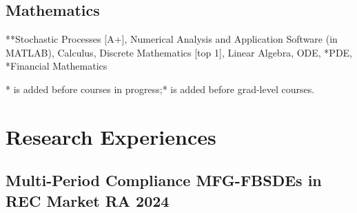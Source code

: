 \documentclass[a4paper]{article}
\newcommand{\mygray}{\color{lg}}
\begin{document}
\subsection{Mathematics} 
**Stochastic Processes [A+], Numerical Analysis and Application Software (in MATLAB), Calculus, Discrete Mathematics [top 1], Linear Algebra, ODE, *PDE, *Financial Mathematics

{\mygray
* is added before courses in progress;\hfill ** is added before grad-level courses.}

\section{Research Experiences}  %

\hypertarget{FBSDEs}{
    \subsection{Multi-Period Compliance MFG-FBSDEs in REC Market \normalfont \hfill RA \hfill 2024}}
    
\end{document}
